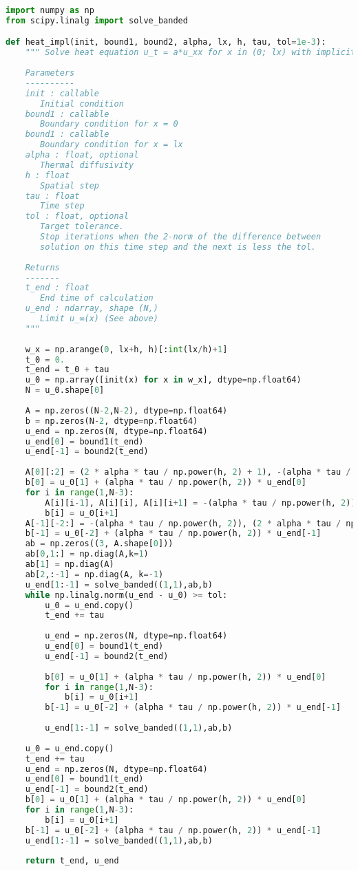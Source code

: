 \begin{lstlisting}[language=Python, caption=Реализация неявного метода на языке Python]
import numpy as np
from scipy.linalg import solve_banded

def heat_impl(init, bound1, bound2, alpha, lx, h, tau, tol=1e-3):
    """ Solve heat equation u_t = a*u_xx for x in (0; lx) with implicit scheme
    
    Parameters
    ----------
    init : callable
       Initial condition
    bound1 : callable
       Boundary condition for x = 0
    bound1 : callable
       Boundary condition for x = lx
    alpha : float, optional
       Thermal diffusivity
    h : float
       Spatial step
    tau : float
       Time step
    tol : float, optional
       Target tolerance.
       Stop iterations when the 2-norm of the difference between 
       solution on this time step and the next is less the tol.
       
    Returns
    -------
    t_end : float
       End time of calculation
    u_end : ndarray, shape (N,)
       Limit u_∞(x) (See above)
    """
    
    w_x = np.arange(0, lx+h, h)[:int(lx/h)+1]
    t_0 = 0.
    t_end = t_0 + tau
    u_0 = np.array([init(x) for x in w_x], dtype=np.float64)
    N = u_0.shape[0]
    
    A = np.zeros((N-2,N-2), dtype=np.float64)
    b = np.zeros(N-2, dtype=np.float64)
    u_end = np.zeros(N, dtype=np.float64)
    u_end[0] = bound1(t_end)
    u_end[-1] = bound2(t_end)
    
    A[0][:2] = (2 * alpha * tau / np.power(h, 2) + 1), -(alpha * tau / np.power(h, 2))
    b[0] = u_0[1] + (alpha * tau / np.power(h, 2)) * u_end[0]
    for i in range(1,N-3):
        A[i][i-1], A[i][i], A[i][i+1] = -(alpha * tau / np.power(h, 2)), (2 * alpha * tau / np.power(h, 2) + 1), -(alpha * tau / np.power(h, 2))
        b[i] = u_0[i+1]
    A[-1][-2:] = -(alpha * tau / np.power(h, 2)), (2 * alpha * tau / np.power(h, 2) + 1)
    b[-1] = u_0[-2] + (alpha * tau / np.power(h, 2)) * u_end[-1]
    ab = np.zeros((3, A.shape[0]))
    ab[0,1:] = np.diag(A,k=1)
    ab[1] = np.diag(A)
    ab[2,:-1] = np.diag(A, k=-1)
    u_end[1:-1] = solve_banded((1,1),ab,b) 
    while np.linalg.norm(u_end - u_0) >= tol:
        u_0 = u_end.copy()
        t_end += tau
        
        u_end = np.zeros(N, dtype=np.float64)
        u_end[0] = bound1(t_end)
        u_end[-1] = bound2(t_end)
        
        b[0] = u_0[1] + (alpha * tau / np.power(h, 2)) * u_end[0]
        for i in range(1,N-3):
            b[i] = u_0[i+1]
        b[-1] = u_0[-2] + (alpha * tau / np.power(h, 2)) * u_end[-1]
        
        u_end[1:-1] = solve_banded((1,1),ab,b)   
        
    u_0 = u_end.copy()
    t_end += tau
    u_end = np.zeros(N, dtype=np.float64)
    u_end[0] = bound1(t_end)
    u_end[-1] = bound2(t_end)
    b[0] = u_0[1] + (alpha * tau / np.power(h, 2)) * u_end[0]
    for i in range(1,N-3):
        b[i] = u_0[i+1]
    b[-1] = u_0[-2] + (alpha * tau / np.power(h, 2)) * u_end[-1]
    u_end[1:-1] = solve_banded((1,1),ab,b) 
    
    return t_end, u_end
\end{lstlisting}
